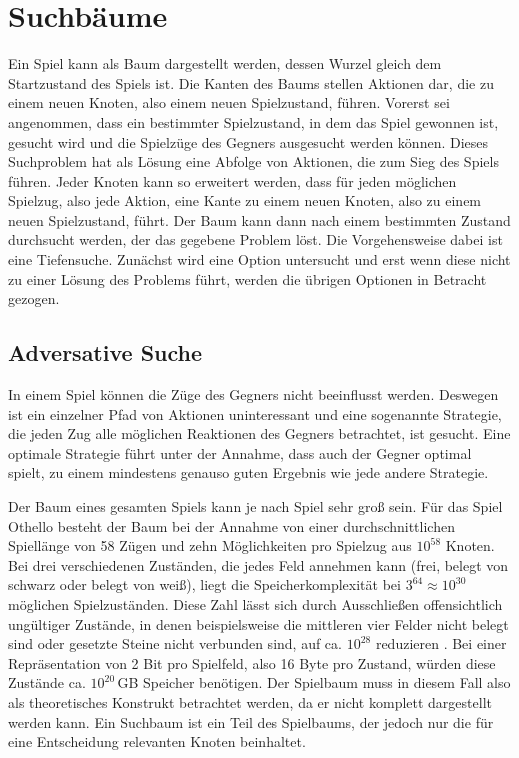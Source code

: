 \section{Suchbäume}
\label{sec:gametree}

Ein Spiel kann als Baum dargestellt werden, dessen Wurzel gleich dem Startzustand des Spiels ist. Die Kanten des Baums
stellen Aktionen dar, die zu einem neuen Knoten, also einem neuen Spielzustand, führen. Vorerst sei angenommen, dass ein
bestimmter Spielzustand, in dem das Spiel gewonnen ist, gesucht wird und die Spielzüge des Gegners ausgesucht werden
können. Dieses Suchproblem hat als Lösung eine Abfolge von Aktionen, die zum Sieg des Spiels führen. Jeder Knoten kann
so erweitert werden, dass für jeden möglichen Spielzug, also jede Aktion, eine Kante zu einem neuen Knoten, also zu
einem neuen Spielzustand, führt. Der Baum kann dann nach einem bestimmten Zustand durchsucht werden, der das gegebene
Problem löst. Die Vorgehensweise dabei ist eine Tiefensuche. Zunächst wird eine Option untersucht und erst wenn diese
nicht zu einer Lösung des Problems führt, werden die übrigen Optionen in Betracht gezogen.
\cite[S.~75]{ai2010russel}

\subsection{Adversative Suche}
In einem Spiel können die Züge des Gegners nicht beeinflusst werden. Deswegen ist ein einzelner Pfad von Aktionen
uninteressant und eine sogenannte Strategie, die jeden Zug alle möglichen Reaktionen des Gegners betrachtet, ist
gesucht. Eine optimale Strategie führt unter der Annahme, dass auch der Gegner optimal spielt, zu einem mindestens
genauso guten Ergebnis wie jede andere Strategie.
\cite[S.~163f.]{ai2010russel}

Der Baum eines gesamten Spiels kann je nach Spiel sehr groß sein. Für das Spiel Othello besteht der Baum bei der Annahme
von einer durchschnittlichen Spiellänge von 58 Zügen und zehn Möglichkeiten pro Spielzug aus $10^{58}$ Knoten. Bei drei
verschiedenen Zuständen, die jedes Feld annehmen kann (frei, belegt von schwarz oder belegt von weiß), liegt die
Speicherkomplexität bei $3^{64}\approx10^{30}$ möglichen Spielzuständen. Diese Zahl lässt sich durch Ausschließen
offensichtlich ungültiger Zustände, in denen beispielsweise die mittleren vier Felder nicht belegt sind oder gesetzte
Steine nicht verbunden sind, auf ca. $10^{28}$ reduzieren \cite[S.~167]{searchingforsolutions}.
Bei einer Repräsentation von 2 Bit pro Spielfeld, also 16 Byte pro Zustand, würden diese Zustände ca. $10^{20}$\,GB
Speicher benötigen. Der Spielbaum muss in diesem Fall also als theoretisches Konstrukt betrachtet werden, da er nicht
komplett dargestellt werden kann. Ein Suchbaum ist ein Teil des Spielbaums, der jedoch nur die für eine Entscheidung
relevanten Knoten beinhaltet.
\cite[S.~162f.]{ai2010russel}

